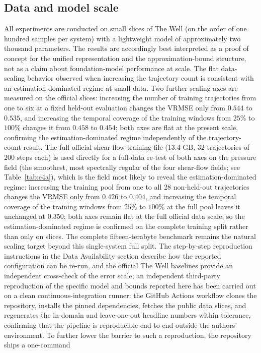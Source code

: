 \documentclass[preprint,12pt]{elsarticle}
\begin{document}
\subsection{Data and model scale}
All experiments are conducted on small slices of The Well (on the order of one hundred samples per
system) with a lightweight model of approximately two thousand parameters. The results are
accordingly best interpreted as a proof of concept for the unified representation and the
approximation-bound structure, not as a claim about foundation-model performance at scale. The
flat data-scaling behavior observed when increasing the trajectory count is consistent with an
estimation-dominated regime at small data. Two further scaling axes are measured on the official
slices: increasing the number of training trajectories from one to six at a fixed held-out
evaluation changes the VRMSE only from $0.544$ to $0.535$, and increasing the temporal coverage of
the training windows from $25\%$ to $100\%$ changes it from $0.458$ to $0.454$; both axes are flat
at the present scale, confirming the estimation-dominated regime independently of the
trajectory-count result. The full official shear-flow training file (13.4 GB, $32$ trajectories of
$200$ steps each) is used directly for a full-data re-test of both axes on the pressure field
(the smoothest, most spectrally regular of the four shear-flow fields; see Table~\ref{tab:e4a}),
which is the field most likely to reveal the estimation-dominated regime: increasing the training
pool from one to all $28$ non-held-out trajectories changes the VRMSE only from $0.426$ to
$0.404$, and increasing the temporal coverage of the training windows from $25\%$ to $100\%$ at
the full pool leaves it unchanged at $0.350$; both axes remain flat at the full official data
scale, so the estimation-dominated regime is confirmed on the complete training split rather than
only on slices. The complete fifteen-terabyte benchmark remains the natural scaling target beyond
this single-system full split. The step-by-step
reproduction instructions in the Data Availability section describe how the reported configuration
can be re-run, and the official The Well baselines provide an independent cross-check of the error
scale; an independent third-party reproduction of the specific model and bounds
reported here has been carried out on a clean continuous-integration runner: the GitHub Actions workflow clones the repository, installs the pinned dependencies, fetches the public data slices, and regenerates the in-domain and leave-one-out headline numbers within tolerance, confirming that the pipeline is reproducible end-to-end outside the authors' environment. To further lower the barrier to such a reproduction, the repository ships a one-command
\end{document}
